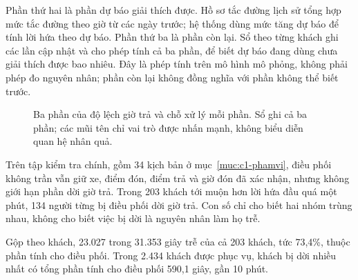 Phần thứ hai là phần dự báo giải thích được. Hồ sơ tắc đường lịch sử tổng hợp mức tắc đường theo giờ từ
các ngày trước; hệ thống dùng mức tăng dự báo để tính lời hứa theo dự báo. Phần thứ ba là phần còn lại.
Sổ theo từng khách ghi các lần cập nhật và cho phép tính cả ba phần, để biết dự báo đang dùng chưa giải
thích được bao nhiêu. Đây là phép tính trên mô hình mô phỏng, không phải phép đo nguyên nhân; phần còn lại
không đồng nghĩa với phần không thể biết trước.

\begin{figure}[htbp]
\centering
{}
\caption{Ba phần của độ lệch giờ trả và chỗ xử lý mỗi phần. Sổ ghi cả ba phần; các mũi tên chỉ vai trò
được nhấn mạnh, không biểu diễn quan hệ nhân quả.}
\label{hinh:c1-baphan}
\end{figure}

Trên tập kiểm tra chính, gồm 34 kịch bản ở mục~\ref{muc:c1-phamvi}, điều phối không trần vẫn giữ xe, điểm đón,
điểm trả và giờ đón đã xác nhận, nhưng không giới hạn phần dời giờ trả. Trong 203 khách tới muộn hơn lời hứa
đầu quá một phút, 134 người từng bị điều phối dời giờ trả. Con số chỉ cho biết hai nhóm trùng nhau, không
cho biết việc bị dời là nguyên nhân làm họ trễ.

Gộp theo khách, 23.027 trong 31.353 giây trễ của cả 203 khách, tức 73,4\%, thuộc phần tính cho điều phối.
Trong 2.434 khách được phục vụ, khách bị dời nhiều nhất có tổng phần tính cho điều phối 590,1 giây,
gần 10 phút.

